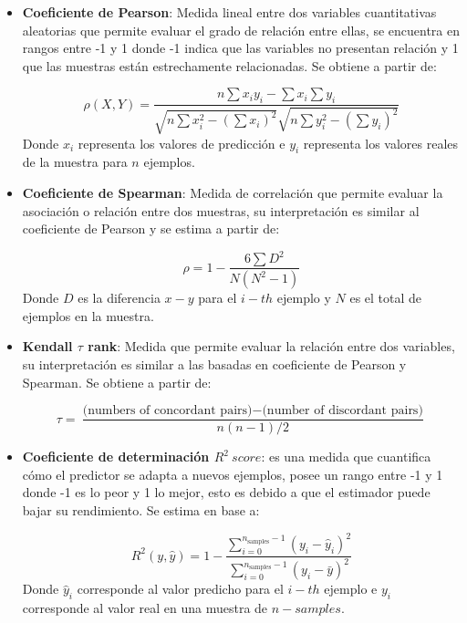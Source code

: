 \begin{itemize}
		
	\item \textbf{Coeficiente de Pearson}: Medida lineal entre dos variables cuantitativas aleatorias que permite evaluar el grado de relación entre ellas, se encuentra en rangos entre -1 y 1 donde -1 indica que las variables no presentan relación y 1 que las muestras están estrechamente relacionadas. Se obtiene a partir de:
	
	\begin{equation}
\rho (X,Y)= \frac{n\sum x_{i}y_{i} - \sum x_{i} \sum y_{i}}{\sqrt{n\sum x^{2}_{i}- (\sum x_{i})^{2}} \sqrt{n\sum y^{2}_{i}- (\sum y_{i})^{2}}}
	\end{equation}
	Donde $x_{i}$ representa los valores de predicción e $y_{i}$ representa los valores reales de la muestra para $n$ ejemplos.
		
	\item \textbf{Coeficiente de Spearman}: Medida de correlación que permite evaluar la asociación o relación entre dos muestras, su interpretación es similar al coeficiente de Pearson y se estima a partir de:
	
	\begin{equation}
		\rho = 1- \frac{6\sum D^{2}}{N(N^{2}-1)}
	\end{equation}
	Donde $D$ es la diferencia $x-y$ para el $i-th$ ejemplo y $N$ es el total de ejemplos en la muestra.
		
	\item \textbf{Kendall $\tau$ rank}: Medida que permite evaluar la relación entre dos variables, su interpretación es similar a las basadas en coeficiente de Pearson y Spearman. Se obtiene a partir de:
	
	\begin{equation}
		\tau = \frac{\text{(numbers of concordant pairs)} - \text{(number of discordant pairs)}}{n(n-1)/2}
	\end{equation} 
		
	\item \textbf{Coeficiente de determinación $R^{2}\ score$}: es una medida que cuantifica cómo el predictor se adapta a nuevos ejemplos, posee un rango entre -1 y 1 donde -1 es lo peor y 1 lo mejor, esto es debido a que el estimador puede bajar su rendimiento. Se estima en base a:
	
	\begin{equation}
		R^2(y, \hat{y}) = 1 - \frac{\sum_{i=0}^{n_{\text{samples}} - 1} (y_i - \hat{y}_i)^2}{\sum_{i=0}^{n_\text{samples} - 1} (y_i - \bar{y})^2}
	\end{equation}
	Donde $\hat{y}_i$ corresponde al valor predicho para el $i-th$ ejemplo e $y_{i}$ corresponde al valor real en una muestra de $n-samples$.
		

\end{itemize}
